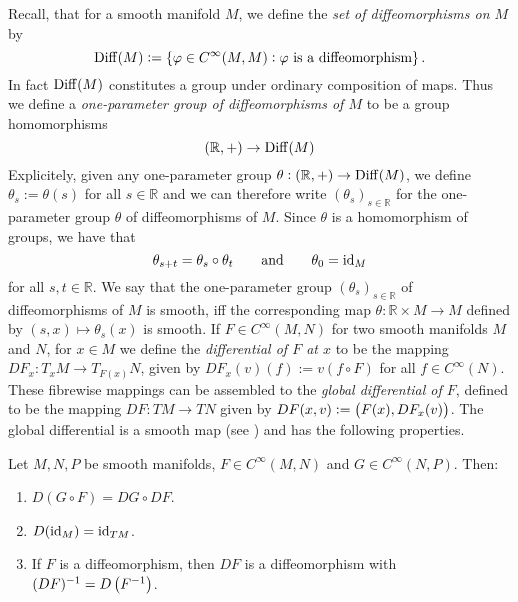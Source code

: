 Recall, that for a smooth manifold $M$, we define the \emph{set of diffeomorphisms on $M$} by
\begin{equation*}
	\Diff(M) := \cbr[0]{\varphi \in C^{\infty}(M,M) : \varphi \text{ is a diffeomorphism}}.
\end{equation*}
In fact $\operatorname{Diff}(M)$ constitutes a group under ordinary composition of maps. Thus we define a \emph{one-parameter group of diffeomorphisms of $M$} to be a group homomorphisms 
\begin{equation*}
	(\mathbb{R},+) \to \operatorname{Diff}(M)
\end{equation*}
Explicitely, given any one-parameter group $\theta : (\mathbb{R},+) \to \operatorname{Diff}(M)$, we define $\theta_s := \theta(s)$ for all $s \in \mathbb{R}$ and we can therefore write $(\theta_s)_{s \in \mathbb{R}}$ for the one-parameter group $\theta$ of diffeomorphisms of $M$. Since $\theta$ is a homomorphism of groups, we have that
\begin{equation*}
	\theta_{s + t} = \theta_s \circ \theta_t \qquad \text{and} \qquad \theta_0 = \operatorname{id}_M
\end{equation*}
\noindent for all $s,t \in \mathbb{R}$. We say that the one-parameter group $(\theta_s)_{s \in \mathbb{R}}$ of diffeomorphisms of $M$ is smooth, iff the corresponding map $\theta : \mathbb{R} \times M \to M$ defined by $(s,x) \mapsto \theta_s(x)$ is smooth. If $F \in C^\infty(M,N)$ for two smooth manifolds $M$ and $N$, for $x \in M$ we define the \emph{differential of $F$ at $x$} to be the mapping $DF_x : T_xM \to T_{F(x)}N$, given by $DF_x(v)(f) := v(f \circ F)$ for all $f \in C^\infty(N)$. These fibrewise mappings can be assembled to the \emph{global differential of $F$}, defined to be the mapping $DF : TM \to TN$ given by $DF(x,v) := \del[1]{F(x),DF_x(v)}$. The global differential is a smooth map (see \cite[68]{lee:smooth_manifolds:2013}) and has the following properties. 

\begin{proposition}
	\label{prop:properties_of_the_global_differential}
	Let $M,N,P$ be smooth manifolds, $F \in C^\infty(M,N)$ and $G \in C^\infty(N,P)$. Then:
	\begin{enumerate}[label = \textup{(\alph*)},leftmargin=*]
		\item $D(G \circ F) = DG \circ DF$.
		\item $D(\operatorname{id}_M) = \operatorname{id}_{TM}$.
		\item If $F$ is a diffeomorphism, then $DF$ is a diffeomorphism with $(DF)^{-1} = D\del[1]{F^{-1}}$.
	\end{enumerate} 
\end{proposition}

